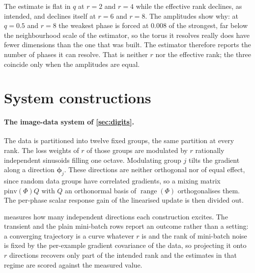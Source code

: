 \documentclass{article}
\newcommand{\vphi}{{\bm{\phi}}}
\begin{document}
The estimate is flat in $q$ at $r = 2$ and $r = 4$ while the effective rank declines, as intended,
and declines itself at $r = 6$ and $r = 8$. The amplitudes show why: at $q = 0.5$ and
$r = 8$ the weakest phase is
forced at $0.008$ of the strongest, far below the neighbourhood scale
of the estimator, so the torus it resolves really does have fewer dimensions than the one that was
built. The estimator therefore reports the number of phases it can resolve. That is neither $r$ nor
the effective rank; the three coincide only when the amplitudes are equal.

\section{System constructions}\label{app:constructions}

\paragraph{The image-data system of \cref{sec:digits}.} The data is partitioned into twelve fixed
groups, the same partition at every rank. The
loss weights of $r$ of those groups are modulated by $r$ rationally independent sinusoids filling
one octave. Modulating group $j$ tilts the gradient along a direction $\vphi_j$. These
directions are neither orthogonal nor of equal effect, since random data groups have correlated
gradients, so a mixing matrix $\mathrm{pinv}(\Phi) Q$ with $Q$ an orthonormal basis of
$\operatorname{range}(\Phi)$ orthogonalises them. The per-phase scalar response gain of the
linearised update is then divided out.

 measures how many independent directions each construction excites. The transient and the plain mini-batch rows report an outcome rather than a setting: a
converging trajectory is a curve whatever $r$ is and the rank of mini-batch noise is fixed by the
per-example gradient covariance of the data, so projecting it onto $r$ directions recovers only
part of the intended rank and the estimates in that regime are scored against the measured
value.
\end{document}
